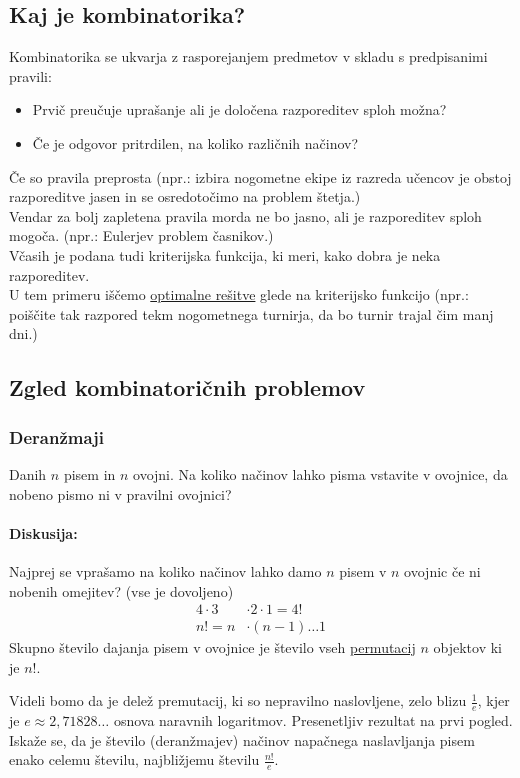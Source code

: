 \subsection{Kaj je kombinatorika?}
Kombinatorika se ukvarja z rasporejanjem predmetov v skladu s predpisanimi pravili:
\begin{itemize}
    \item Prvič preučuje uprašanje ali je določena razporeditev sploh možna?
    \item Če je odgovor pritrdilen, na koliko različnih načinov?
\end{itemize}
Če so pravila preprosta (npr.: izbira nogometne ekipe iz razreda učencov je obstoj razporeditve jasen in se osredotočimo na problem štetja.) \\[1em]
Vendar za bolj zapletena pravila morda ne bo jasno, ali je razporeditev sploh mogoča. (npr.: Eulerjev problem časnikov.) \\[1em]
Včasih je podana tudi kriterijska funkcija, ki meri, kako dobra je neka razporeditev. \\[1em]
U tem primeru iščemo \underline{optimalne rešitve} glede na kriterijsko funkcijo (npr.: poiščite tak razpored tekm nogometnega turnirja, da bo turnir trajal čim manj dni.)

\subsection{Zgled kombinatoričnih problemov}
\subsubsection{Deranžmaji}

Danih $n$ pisem in $n$ ovojni. Na koliko načinov lahko pisma vstavite v ovojnice, da nobeno pismo ni v pravilni ovojnici?

\paragraph{Diskusija:}
Najprej se vprašamo na koliko načinov lahko damo $n$ pisem v $n$ ovojnic če ni nobenih omejitev? (vse je dovoljeno)
\begin{align*}
    4 \cdot 3 &\cdot 2 \cdot 1 = 4! \\
    n! = n &\cdot (n - 1) \dots 1
\end{align*}
Skupno število dajanja pisem v ovojnice je število vseh \underline{permutacij} $n$ objektov ki je $n!$.


\noindent
Videli bomo da je delež premutacij, ki so nepravilno naslovljene, zelo blizu $\frac{1}{e}$, kjer je $e \approx 2,71828\dots$ osnova naravnih logaritmov. 
Presenetljiv rezultat na prvi pogled. 
Iskaže se, da je število (deranžmajev) načinov napačnega naslavljanja pisem enako celemu številu, najbližjemu številu $\frac{n!}{e}$.

